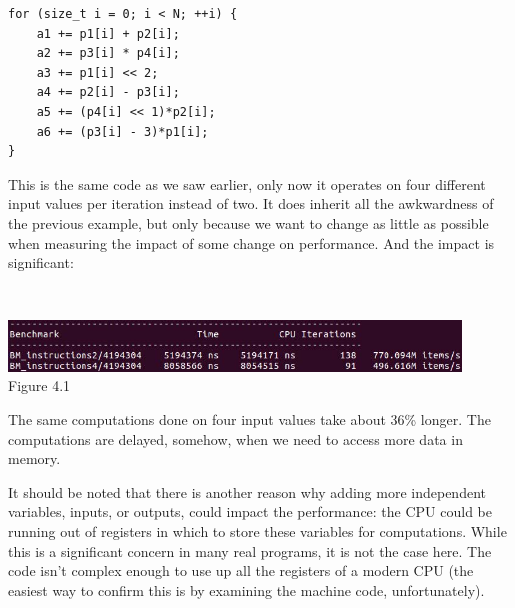 \begin{lstlisting}[style=styleCXX]
for (size_t i = 0; i < N; ++i) {
	a1 += p1[i] + p2[i];
	a2 += p3[i] * p4[i];
	a3 += p1[i] << 2;
	a4 += p2[i] - p3[i];
	a5 += (p4[i] << 1)*p2[i];
	a6 += (p3[i] - 3)*p1[i];
}
\end{lstlisting}

This is the same code as we saw earlier, only now it operates on four different input values per iteration instead of two. It does inherit all the awkwardness of the previous example, but only because we want to change as little as possible when measuring the impact of some change on performance. And the impact is significant:

\hspace*{\fill} \\ %
\begin{center}
\includegraphics[width=0.9\textwidth]{content/1/chapter4/images/1.jpg}\\
Figure 4.1
\end{center}

The same computations done on four input values take about 36\% longer. The computations are delayed, somehow, when we need to access more data in memory.

It should be noted that there is another reason why adding more independent variables, inputs, or outputs, could impact the performance: the CPU could be running out of registers in which to store these variables for computations. While this is a significant concern in many real programs, it is not the case here. The code isn't complex enough to use up all the registers of a modern CPU (the easiest way to confirm this is by examining the machine code, unfortunately).

